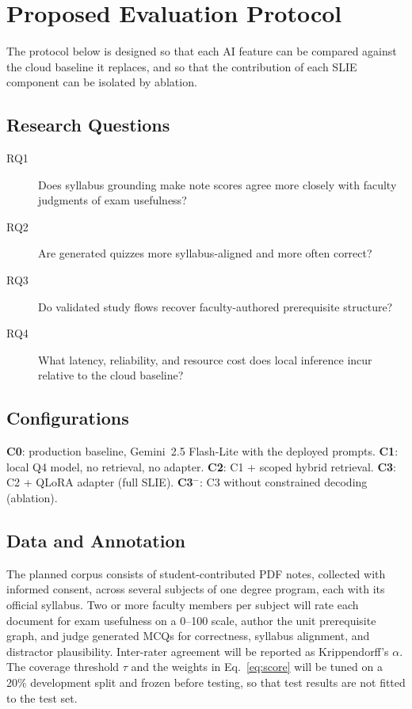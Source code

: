 \documentclass[conference]{IEEEtran}
\begin{document}
\section{Proposed Evaluation Protocol}
\label{sec:eval}

The protocol below is designed so that each AI feature can be compared against
the cloud baseline it replaces, and so that the contribution of each SLIE
component can be isolated by ablation.

\subsection{Research Questions}
\begin{description}
\item[RQ1] Does syllabus grounding make note scores agree more closely with
faculty judgments of exam usefulness?
\item[RQ2] Are generated quizzes more syllabus-aligned and more often
correct?
\item[RQ3] Do validated study flows recover faculty-authored prerequisite
structure?
\item[RQ4] What latency, reliability, and resource cost does local inference
incur relative to the cloud baseline?
\end{description}

\subsection{Configurations}
\textbf{C0}: production baseline, Gemini~2.5 Flash-Lite with the deployed
prompts. \textbf{C1}: local Q4 model, no retrieval, no adapter.
\textbf{C2}: C1 + scoped hybrid retrieval. \textbf{C3}: C2 + QLoRA adapter
(full SLIE). \textbf{C3$^-$}: C3 without constrained decoding (ablation).

\subsection{Data and Annotation}
The planned corpus consists of student-contributed PDF notes, collected with
informed consent, across several subjects of one degree program, each with its
official syllabus. Two or more faculty members per subject will rate each
document for exam usefulness on a 0--100 scale, author the unit prerequisite
graph, and judge generated MCQs for correctness, syllabus alignment, and
distractor plausibility. Inter-rater agreement will be reported as
Krippendorff's $\alpha$. The coverage threshold $\tau$ and the weights in
Eq.~\eqref{eq:score} will be tuned on a 20\% development split and frozen
before testing, so that test results are not fitted to the test set.
\end{document}
